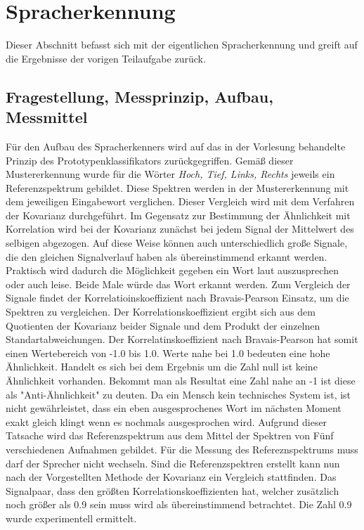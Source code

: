 %
%
\chapter{Spracherkennung}
Dieser Abschnitt befasst sich mit der eigentlichen Spracherkennung und greift auf die Ergebnisse der vorigen Teilaufgabe zurück.
\label{chap:FrequenzgangVonLautsprechern}
\section{Fragestellung, Messprinzip, Aufbau, Messmittel}
\label{chap:VERSUCH_2_FRAGESTELLUNG}
Für den Aufbau des Spracherkenners wird auf das in der Vorlesung behandelte Prinzip
des Prototypenklassifikators zurückgegriffen. \cite[S.24]{Franz2015i}
Gemäß dieser Mustererkennung wurde für die Wörter \textit{Hoch, Tief, Links, Rechts} jeweils ein Referenzspektrum gebildet. Diese Spektren werden in der Mustererkennung mit dem jeweiligen Eingabewort verglichen. Dieser Vergleich wird mit dem Verfahren der Kovarianz durchgeführt. Im Gegensatz zur Bestimmung der Ähnlichkeit mit Korrelation wird bei der Kovarianz zunächst bei jedem Signal der Mittelwert des selbigen abgezogen. Auf diese Weise können auch unterschiedlich große Signale, die den gleichen Signalverlauf haben als übereinstimmend erkannt werden. Praktisch wird dadurch die Möglichkeit gegeben ein Wort laut auszusprechen oder auch leise. Beide Male würde das Wort erkannt werden. Zum Vergleich der Signale findet der Korrelatioinskoeffizient nach Bravais-Pearson Einsatz, um die Spektren zu vergleichen.
Der Korrelationskoeffizient ergibt sich aus dem Quotienten der Kovarianz beider Signale und dem Produkt der einzelnen Standartabweichungen. Der Korrelatinskoeffizient nach Bravais-Pearson hat somit einen Wertebereich von -1.0 bis 1.0. Werte nahe bei 1.0 bedeuten eine hohe Ähnlichkeit. Handelt es sich bei dem Ergebnis um die Zahl null ist keine Ähnlichkeit vorhanden. Bekommt man als Resultat eine Zahl nahe an -1 ist diese als "Anti-Ähnlichkeit" zu deuten.\cite[S.27]{Franz2015i}
Da ein Mensch kein technisches System ist, ist nicht gewährleistet, dass ein eben ausgesprochenes Wort im nächsten Moment exakt gleich klingt wenn es nochmals ausgesprochen wird. Aufgrund dieser Tatsache wird das Referenzspektrum aus dem Mittel der Spektren von Fünf verschiedenen Aufnahmen gebildet. Für die Messung des Refereznspektrums muss darf der Sprecher nicht wechseln.
Sind die Referenzspektren erstellt kann nun nach der Vorgestellten Methode der Kovarianz ein Vergleich stattfinden. Das Signalpaar, dass den größten Korrelationskoeffizienten hat, welcher zusätzlich noch größer als 0.9 sein muss wird als übereinstimmend betrachtet. Die Zahl 0.9 wurde experimentell ermittelt.
